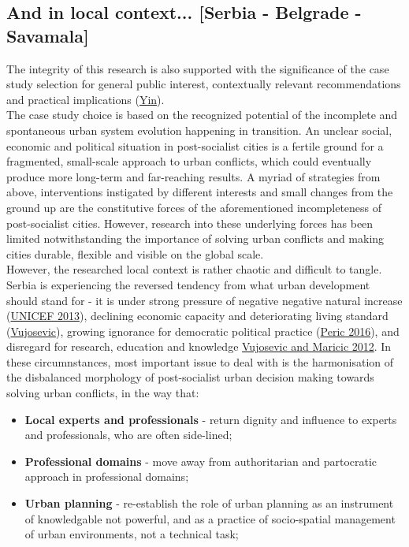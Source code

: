 \documentclass[11pt]{report}
\begin{document}
{\subsection{And in local context... [Serbia - Belgrade - Savamala]}

The integrity of this research is also supported with the significance of the case study selection for general public interest, contextually relevant recommendations and practical implications (\href{}{Yin}).
\\
The case study choice is based on the recognized potential of the incomplete and spontaneous urban system evolution happening in transition.
An unclear social, economic and political situation in post-socialist cities is a fertile ground for a fragmented, small-scale approach to urban conflicts, which could eventually produce more long-term and far-reaching results.
A myriad of strategies from above, interventions instigated by different interests and small changes from the ground up are the constitutive forces of the aforementioned incompleteness of post-socialist cities.
However, research into these underlying forces has been limited notwithstanding the importance of solving urban conflicts and making cities durable, flexible and visible on the global scale.
\\
However, the researched local context is rather chaotic and difficult to tangle.
Serbia is experiencing the reversed tendency from what urban development should stand for - it is under strong pressure of negative negative natural increase (\href{}{UNICEF 2013}), declining economic capacity and deteriorating living standard (\href{}{Vujosevic}), growing ignorance for democratic political practice (\href{}{Peric 2016}), and disregard for research, education and  knowledge \href{}{Vujosevic and Maricic 2012}.
In these circumnstances, most important issue to deal with is the harmonisation of the disbalanced morphology of post-socialist urban decision making towards solving urban conflicts, in the way that:
\begin{itemize}
\item \textbf{Local experts and professionals} - return dignity and influence to experts and professionals, who are often side-lined;

\item \textbf{Professional domains} - move away from authoritarian and partocratic approach in professional domains;

\item \textbf{Urban planning} - re-establish the role of urban planning as an instrument of knowledgable not powerful, and as a practice of socio-spatial management of urban environments, not a technical task;


\end{itemize}}
\end{document}
